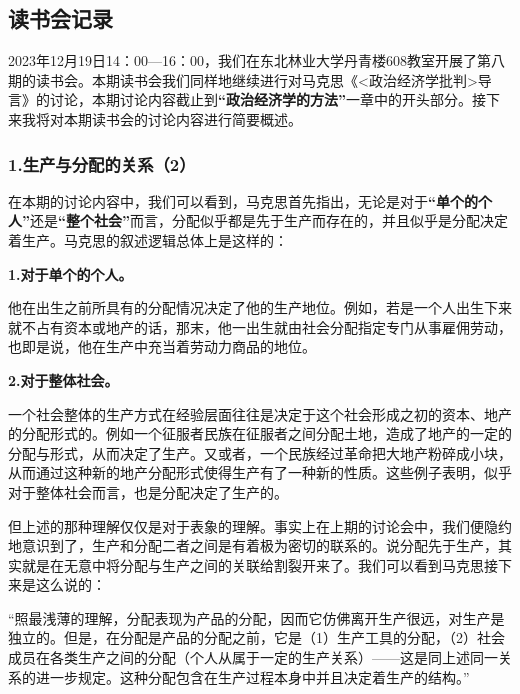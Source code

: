 \documentclass[a4paper,twoside,12pt,AutoFakeBold]{ctexart}
\begin{document}
\subsection{读书会记录}
2023年12月19日14：00—16：00，我们在东北林业大学丹青楼608教室开展了第八期的读书会。本期读书会我们同样地继续进行对马克思《<政治经济学批判>导言》的讨论，本期讨论内容截止到\textbf{“政治经济学的方法”}一章中的开头部分。接下来我将对本期读书会的讨论内容进行简要概述。
\subsubsection{1.生产与分配的关系（2）}
在本期的讨论内容中，我们可以看到，马克思首先指出，无论是对于\textbf{“单个的个人”}还是\textbf{“整个社会”}而言，分配似乎都是先于生产而存在的，并且似乎是分配决定着生产。马克思的叙述逻辑总体上是这样的：

\begin{tcolorbox}
\textbf{1.对于单个的个人。}~\begin{fangsong}
    他在出生之前所具有的分配情况决定了他的生产地位。例如，若是一个人出生下来就不占有资本或地产的话，那末，他一出生就由社会分配指定专门从事雇佣劳动，也即是说，他在生产中充当着劳动力商品的地位。
\end{fangsong}

\textbf{2.对于整体社会。}~\begin{fangsong}
    一个社会整体的生产方式在经验层面往往是决定于这个社会形成之初的资本、地产的分配形式的。例如一个征服者民族在征服者之间分配土地，造成了地产的一定的分配与形式，从而决定了生产。又或者，一个民族经过革命把大地产粉碎成小块，从而通过这种新的地产分配形式使得生产有了一种新的性质。这些例子表明，似乎对于整体社会而言，也是分配决定了生产的。
\end{fangsong}
\end{tcolorbox}

\vspace{0.5cm}
但上述的那种理解仅仅是对于表象的理解。事实上在上期的讨论会中，我们便隐约地意识到了，生产和分配二者之间是有着极为密切的联系的。说分配先于生产，其实就是在无意中将分配与生产之间的关联给割裂开来了。我们可以看到马克思接下来是这么说的：

\vspace{0.3cm}
\begin{adjustwidth}{2em}{2em}
    \qquad\fangsong
    “照最浅薄的理解，分配表现为产品的分配，因而它仿佛离开生产很远，对生产是独立的。但是，在分配是产品的分配之前，它是（1）生产工具的分配，（2）社会成员在各类生产之间的分配（个人从属于一定的生产关系）——这是同上述同一关系的进一步规定。这种分配包含在生产过程本身中并且决定着生产的结构。”
\end{adjustwidth}
\end{document}
